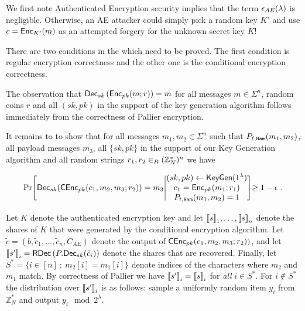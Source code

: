 \begin{theorem}{}
      \ThmHammingDistCorrectness
\end{theorem} 
\begin{proofof}{}
We first note Authenticated Encryption security implies that the term $\epsilon_{AE}(\lambda)$ is negligible. Otherwise, an AE attacker could simply pick a random key $K'$ and use $c={\mathsf{Enc}}_{K'}(m)$ as an attempted forgery for the unknown secret key $K$! 

 There are two conditions in the  which need to be proved. The first condition is regular encryption correctness and the other one is the conditional encryption correctness. 

The observation that ${\mathsf{Dec}}_{sk}\left( {\mathsf{Enc}}_{pk}(m;r)\right) = m $ for all messages $m \in \Sigma^n$, random coins $r$ and all $(sk,pk)$ in the support of the key generation algorithm follows immediately from the correctness of Pallier encryption. 


It remains to to show that for all messages $ m_1, m_2 \in \Sigma^n$ such that $P_{\ell, {\mathtt{Ham}}}(m_1,m_2) $, all payload messages $m_3$, all $\{sk,pk\}$ in the support of our Key Generation algorithm and all random strings $ r_1, r_2 \in_R (\mathbb{Z}_{N}^*)^n$
we have


 
\begin{align}\eqnlab{EQ:EncCor2}	
\Pr \Biggl[\Dec_{sk}(\Cond\Enc_{pk}(c_1, m_2, m_3; r_2)) = m_3 \Biggl| \begin{matrix}
	(sk, pk)\gets \KG (1^\lambda) \\ 
	c_1 = \Enc_{pk}(m_1; r_1) \\
	P_{t,\Ham}  (m_1, m_2) = 1
	\end{matrix} \Biggl] \geq 1 - \eps \ .
  	\end{align}  
   
Let $K$ denote the authenticated encryption key and let  $ \mathopen{\lbrack\!\lbrack} s \mathclose{\rbrack\!\rbrack}_1,\ldots,   \mathopen{\lbrack\!\lbrack} s \mathclose{\rbrack\!\rbrack}_n$ denote the shares of $K$ that were generated by the conditional encryption algorithm. Let $\tilde{c} = (b,\tilde{c}_1,\ldots, \tilde{c}_n, C_{AE})$ denote the output of ${\mathsf{C}}{\mathsf{Enc}}_{pk}(c_1, m_2, m_3; r_2))$, and let  $\mathopen{\lbrack\!\lbrack} s' \mathclose{\rbrack\!\rbrack}_i = {\mathsf{RDec}}\left( P.{\mathsf{Dec}}_{sk}(\tilde{c}_i) \right)$ denote the shares that are recovered. Finally, let $S^* = \{ i \in [n]~: ~m_2[i]=m_1[i]\}$ denote indices of the characters where $m_2$ and $m_1$ match. By correctness of Pallier we have $\mathopen{\lbrack\!\lbrack} s' \mathclose{\rbrack\!\rbrack}_i = \mathopen{\lbrack\!\lbrack} s \mathclose{\rbrack\!\rbrack}_i$  for {\em all} $i \in S^*$. For $i \not \in S^*$ the distribution over $\mathopen{\lbrack\!\lbrack} s' \mathclose{\rbrack\!\rbrack}_i$ is as follows: sample a uniformly random item $y_i$ from $\mathbb{Z}_N^*$ and output $y_i \mod{2^{\lambda}}$.





\end{proofof}
